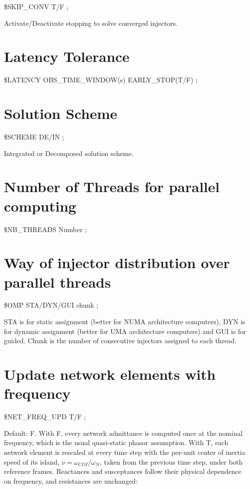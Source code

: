 \$SKIP\_CONV T/F ; 

Activate/Deactivate stopping to solve converged injectors.


\section{Latency Tolerance}

 \$LATENCY OBS\_TIME\_WINDOW(s) EARLY\_STOP(T/F)
	; 


\section{Solution Scheme}

 \$SCHEME DE/IN ; 

Integrated or Decomposed solution scheme.


\section{Number of Threads for parallel computing}

 \$NB\_THREADS Number ;


\section{Way of injector distribution over parallel
	threads}

 \$OMP STA/DYN/GUI chunk ;

STA is for static assignment (better for NUMA architecture computers),
DYN is for dynamic assignment (better for UMA architecture computers)
and GUI is for guided. Chunk is the number of consecutive injectors
assigned to each thread.


\section{Update network elements with frequency}

 \$NET\_FREQ\_UPD T/F ;

Default: F. With F, every network admittance is computed once at the nominal
frequency, which is the usual quasi-static phasor assumption. With T, each
network element is rescaled at every time step with the per-unit center of
inertia speed of its island, $\nu = \omega_{COI}/\omega_N$, taken from the
previous time step, under both reference frames. Reactances and susceptances
follow their physical dependence on frequency, and resistances are unchanged:

